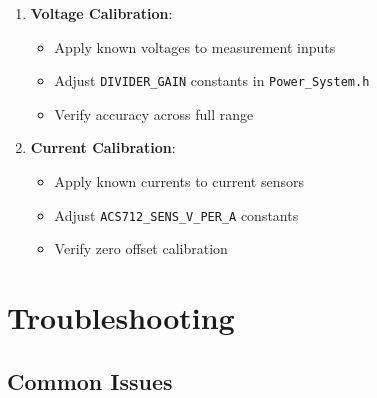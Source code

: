 \documentclass[11pt,a4paper]{article}
\begin{document}
\begin{enumerate}
    \item \textbf{Voltage Calibration}:
    \begin{itemize}
        \item Apply known voltages to measurement inputs
        \item Adjust \texttt{DIVIDER\_GAIN} constants in \texttt{Power\_System.h}
        \item Verify accuracy across full range
    \end{itemize}
    
    \item \textbf{Current Calibration}:
    \begin{itemize}
        \item Apply known currents to current sensors
        \item Adjust \texttt{ACS712\_SENS\_V\_PER\_A} constants
        \item Verify zero offset calibration
    \end{itemize}
\end{enumerate}

\section{Troubleshooting}

\subsection{Common Issues}
\end{document}
